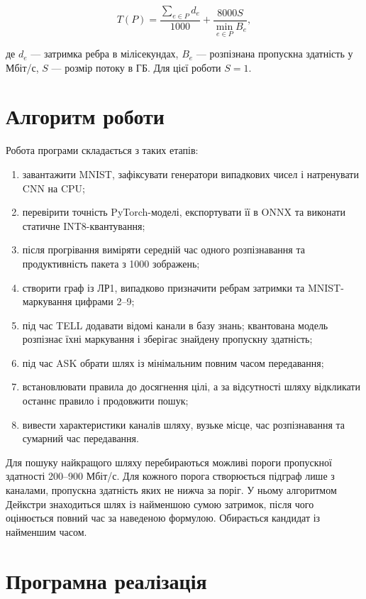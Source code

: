 \documentclass[12pt,a4paper]{article}
\begin{document}
\begin{equation}
  T(P)=\frac{\sum\limits_{e\in P}d_e}{1000}
       +\frac{8000S}{\min\limits_{e\in P}B_e},
\end{equation}

де $d_e$ --- затримка ребра в мілісекундах, $B_e$ --- розпізнана пропускна
здатність у Мбіт/с, $S$ --- розмір потоку в ГБ. Для цієї роботи $S=1$.

\section{Алгоритм роботи}

Робота програми складається з таких етапів:

\begin{enumerate}[leftmargin=2cm]
  \item завантажити MNIST, зафіксувати генератори випадкових чисел і
        натренувати CNN на CPU;
  \item перевірити точність PyTorch-моделі, експортувати її в ONNX та
        виконати статичне INT8-квантування;
  \item після прогрівання виміряти середній час одного розпізнавання та
        продуктивність пакета з 1000 зображень;
  \item створити граф із ЛР1, випадково призначити ребрам затримки та
        MNIST-маркування цифрами 2--9;
  \item під час TELL додавати відомі канали в базу знань; квантована модель
        розпізнає їхні маркування і зберігає знайдену пропускну здатність;
  \item під час ASK обрати шлях із мінімальним повним часом передавання;
  \item встановлювати правила до досягнення цілі, а за відсутності шляху
        відкликати останнє правило і продовжити пошук;
  \item вивести характеристики каналів шляху, вузьке місце, час
        розпізнавання та сумарний час передавання.
\end{enumerate}

Для пошуку найкращого шляху перебираються можливі пороги пропускної
здатності 200--900 Мбіт/с. Для кожного порога створюється підграф лише з
каналами, пропускна здатність яких не нижча за поріг. У ньому алгоритмом
Дейкстри знаходиться шлях із найменшою сумою затримок, після чого оцінюється
повний час за наведеною формулою. Обирається кандидат із найменшим часом.

\section{Програмна реалізація}
\end{document}
